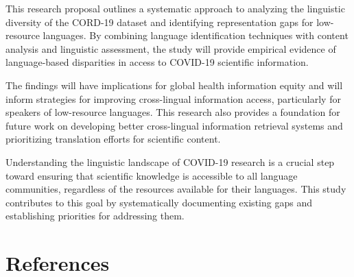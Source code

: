 \documentclass[
]{article}
\begin{document}
This research proposal outlines a systematic approach to analyzing the
linguistic diversity of the CORD-19 dataset and identifying
representation gaps for low-resource languages. By combining language
identification techniques with content analysis and linguistic
assessment, the study will provide empirical evidence of language-based
disparities in access to COVID-19 scientific information.

The findings will have implications for global health information equity
and will inform strategies for improving cross-lingual information
access, particularly for speakers of low-resource languages. This
research also provides a foundation for future work on developing better
cross-lingual information retrieval systems and prioritizing translation
efforts for scientific content.

Understanding the linguistic landscape of COVID-19 research is a crucial
step toward ensuring that scientific knowledge is accessible to all
language communities, regardless of the resources available for their
languages. This study contributes to this goal by systematically
documenting existing gaps and establishing priorities for addressing
them.

\section{References}\label{sec-references}
\end{document}

